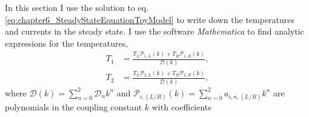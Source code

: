 %
In this section I use the solution to eq. \eqref{eq:chapter6_SteadyStateEquationToyModel} to write down the temperatures and currents in the steady state. I use the software {\it Mathematica} to find analytic expressions for the temperatures,
%
\begin{align}
  T_1 &= \frac{T_L \mathcal{P}_{1,L}(k) + T_R \mathcal{P}_{1,R}(k)}{\mathcal{D}(k)},\nonumber
  \\
  T_2 &= \frac{T_L \mathcal{P}_{2,L}(k) + T_R \mathcal{P}_{2,R}(k)}{\mathcal{D}(k)},
  \label{eq:chapter6_ModelBTemperatures}
\end{align}
%
where $\mathcal{D}(k) =  \sum\limits_{n=0}^2 \mathcal{D}_n k^n$ and $\mathcal{P}_{i,(L/R)}(k) = \sum\limits_{n=0}^2 a_{i,n,(L/R)} k^n$ are polynomials in the coupling constant $k$ with coefficients
%

